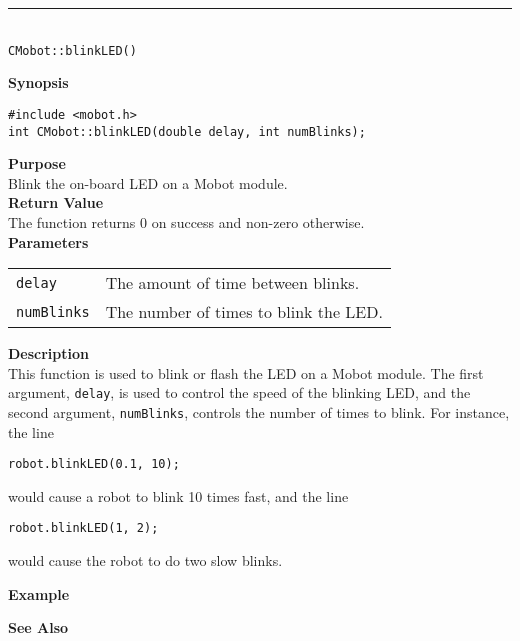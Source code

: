 \noindent
\vspace{5pt}
\rule{4.5in}{0.015in}\\
\noindent
{\LARGE \texttt{CMobot::blinkLED()}}\\
{}

\noindent
{\bf Synopsis}
\vspace{-8pt}
\begin{verbatim}
#include <mobot.h>
int CMobot::blinkLED(double delay, int numBlinks);
\end{verbatim}

\noindent
{\bf Purpose}\\
Blink the on-board LED on a Mobot module.\\

\noindent
{\bf Return Value}\\
The function returns 0 on success and non-zero otherwise.\\

\noindent
{\bf Parameters}\\
\vspace{-0.1in}
\begin{description}
\item               
\begin{tabular}{p{15 mm}p{125 mm}}
\texttt{delay} & The amount of time between blinks. \\
\texttt{numBlinks} & The number of times to blink the LED. \\
\end{tabular}
\end{description}
\noindent
{\bf Description}\\
\vspace{-12pt}
This function is used to blink or flash the LED on a Mobot module. The first
argument, \texttt{delay}, is used to control the speed of the blinking
LED, and the second argument, \texttt{numBlinks}, controls the number of times
to blink. For instance, the line
\begin{verbatim}
robot.blinkLED(0.1, 10);
\end{verbatim}
would cause a robot to blink 10 times fast, and the line
\begin{verbatim}
robot.blinkLED(1, 2);
\end{verbatim}
would cause the robot to do two slow blinks.

\noindent
{\bf Example}\\
\noindent

\noindent
{\bf See Also}\\

